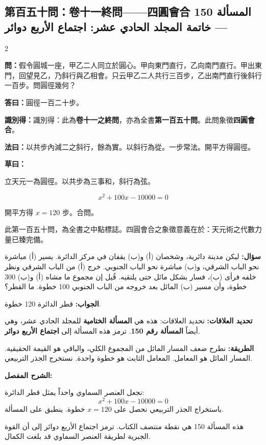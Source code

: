 \documentclass[11pt,a4paper]{article}
\newcommand{\ar}[1]{\arabicfont\beginR #1\endR}
\newcommand{\arb}[1]{\textbf{\arabicfont\beginR #1\endR}}
\newcommand{\arnote}[1]{\textcolor{arabicblue}{\ar{#1}}}
\newcommand{\wen}[1]{\par\noindent\textbf{\textcolor{probcolor}{問：}}{#1}\par}
\newcommand{\da}[1]{\par\noindent\textbf{\textcolor{anscolor}{答曰：}}{#1}\par}
\newcommand{\fayue}[1]{\par\noindent\textbf{\textcolor{methodcolor}{法曰：}}{#1}\par}
\newcommand{\caoyue}[1]{\par\noindent\textbf{草曰：}{#1}\par}
\newcommand{\zhi}[1]{\par\noindent\textbf{識別得：}{#1}\par}
\newcommand{\arwen}[1]{\par\noindent\arb{سؤال: }\arnote{#1}\par}
\newcommand{\arjwb}[1]{\par\noindent\arb{الجواب: }\arnote{#1}\par}
\newcommand{\arqwd}[1]{\par\noindent\arb{الطريقة: }\arnote{#1}\par}
\newcommand{\arshr}[1]{\par\noindent\arb{الشرح المفصل: }\arnote{#1}\par}
\newcommand{\arfl}[1]{\par\noindent\arb{تحديد العلاقات: }\arnote{#1}\par}
\begin{document}
\subsection*{第百五十問：卷十一終問——四圓會合 \hfill \ar{المسألة 150 — خاتمة المجلد الحادي عشر: اجتماع الأربع دوائر}}

\begin{paracol}{2}

\begin{leftcolumn}
\wen{假令圓城一座，甲乙二人同立於圓心。甲向東門直行，乙向南門直行。甲出東門，回望見乙，乃斜行與乙相會。只云甲乙二人共行三百步，乙出南門直行後斜行一百步。問圓徑幾何？}

\da{圓徑一百二十步。}

\zhi{識別得：此為\textbf{卷十一之終問}，亦為全書\textbf{第一百五十問}。此問象徵\textbf{四圓會合}。}

\fayue{以共步內減二之斜行，餘為實。以斜行為從。一步常法。開平方得圓徑。}

\caoyue{
立天元一為圓徑。以共步為三事和，斜行為弦。

$$x^2 + 100x - 10000 = 0$$

開平方得 $x = 120$ 步。合問。

此第一百五十問，為全書之中點標誌。四圓會合之象徵意義在於：天元術之代數力量已臻完備。}
\end{leftcolumn}

\begin{rightcolumn}
\arwen{ليكن مدينة دائرية، وشخصان (أ) و(ب) يقفان في مركز الدائرة. يسير (أ) مباشرة نحو الباب الشرقي، و(ب) مباشرة نحو الباب الجنوبي. خرج (أ) من الباب الشرقي ونظر خلفه فرأى (ب)، فسار بشكل مائل حتى يلتقيه. قُيل إن مجموع ما مشاه (أ) و(ب) 300 خطوة، وأن مسير (ب) المائل بعد خروجه من الباب الجنوبي 100 خطوة. ما القطر؟}

\arjwb{قطر الدائرة 120 خطوة.}

\arfl{تحديد العلاقات: هذه هي \textbf{المسألة الختامية} للمجلد الحادي عشر، وهي أيضاً \textbf{المسألة رقم 150}. ترمز هذه المسألة إلى \textbf{اجتماع الأربع دوائر}.}

\arqwd{نطرح ضعف المسار المائل من المجموع الكلي، والباقي هو القيمة الحقيقية. المسار المائل هو المعامل. المعامل الثابت هو خطوة واحدة. نستخرج الجذر التربيعي.}

\arshr{نجعل العنصر السماوي واحداً يمثل قطر الدائرة:
$$x^2 + 100x - 10000 = 0$$
باستخراج الجذر التربيعي نحصل على $x = 120$ خطوة. ينطبق على المسألة.

هذه المسألة 150 هي نقطة منتصف الكتاب. ترمز اجتماع الأربع دوائر إلى أن القوة الجبرية لطريقة العنصر السماوي قد بلغت الكمال.}
\end{rightcolumn}

\end{paracol}
\end{document}
